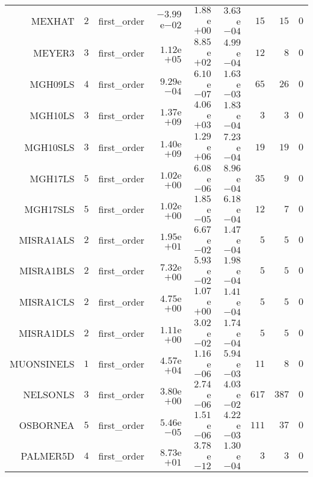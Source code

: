 \begin{longtable}{rrrrrrrrr}
MEXHAT & \(     2\) & first\_order & \(-3.99\)e\(-02\) & \( 1.88\)e\(+00\) & \( 3.63\)e\(-04\) & \(    15\) & \(    15\) & \(     0\) \\
MEYER3 & \(     3\) & first\_order & \( 1.12\)e\(+05\) & \( 8.85\)e\(+02\) & \( 4.99\)e\(-04\) & \(    12\) & \(     8\) & \(     0\) \\
MGH09LS & \(     4\) & first\_order & \( 9.29\)e\(-04\) & \( 6.10\)e\(-07\) & \( 1.63\)e\(-03\) & \(    65\) & \(    26\) & \(     0\) \\
MGH10LS & \(     3\) & first\_order & \( 1.37\)e\(+09\) & \( 4.06\)e\(+03\) & \( 1.83\)e\(-04\) & \(     3\) & \(     3\) & \(     0\) \\
MGH10SLS & \(     3\) & first\_order & \( 1.40\)e\(+09\) & \( 1.29\)e\(+06\) & \( 7.23\)e\(-04\) & \(    19\) & \(    19\) & \(     0\) \\
MGH17LS & \(     5\) & first\_order & \( 1.02\)e\(+00\) & \( 6.08\)e\(-06\) & \( 8.96\)e\(-04\) & \(    35\) & \(     9\) & \(     0\) \\
MGH17SLS & \(     5\) & first\_order & \( 1.02\)e\(+00\) & \( 1.85\)e\(-05\) & \( 6.18\)e\(-04\) & \(    12\) & \(     7\) & \(     0\) \\
MISRA1ALS & \(     2\) & first\_order & \( 1.95\)e\(+01\) & \( 6.67\)e\(-02\) & \( 1.47\)e\(-04\) & \(     5\) & \(     5\) & \(     0\) \\
MISRA1BLS & \(     2\) & first\_order & \( 7.32\)e\(+00\) & \( 5.93\)e\(-02\) & \( 1.98\)e\(-04\) & \(     5\) & \(     5\) & \(     0\) \\
MISRA1CLS & \(     2\) & first\_order & \( 4.75\)e\(+00\) & \( 1.07\)e\(+00\) & \( 1.41\)e\(-04\) & \(     5\) & \(     5\) & \(     0\) \\
MISRA1DLS & \(     2\) & first\_order & \( 1.11\)e\(+00\) & \( 3.02\)e\(-02\) & \( 1.74\)e\(-04\) & \(     5\) & \(     5\) & \(     0\) \\
MUONSINELS & \(     1\) & first\_order & \( 4.57\)e\(+04\) & \( 1.16\)e\(-06\) & \( 5.94\)e\(-03\) & \(    11\) & \(     8\) & \(     0\) \\
NELSONLS & \(     3\) & first\_order & \( 3.80\)e\(+00\) & \( 2.74\)e\(-06\) & \( 4.03\)e\(-02\) & \(   617\) & \(   387\) & \(     0\) \\
OSBORNEA & \(     5\) & first\_order & \( 5.46\)e\(-05\) & \( 1.51\)e\(-06\) & \( 4.22\)e\(-03\) & \(   111\) & \(    37\) & \(     0\) \\
PALMER5D & \(     4\) & first\_order & \( 8.73\)e\(+01\) & \( 3.78\)e\(-12\) & \( 1.30\)e\(-04\) & \(     3\) & \(     3\) & \(     0\) \\

\end{longtable}
